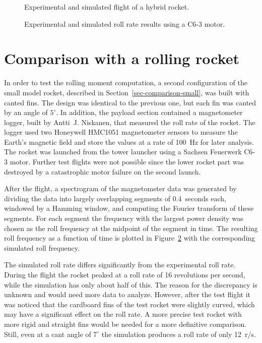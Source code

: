\begin{figure}[p]
\centering
{}
\caption{Experimental and simulated flight of a hybrid rocket.}
\label{fig-flight-haisunaata}
\end{figure}

\begin{figure}[p]
\centering
{}
\caption{Experimental and simulated roll rate results using a C6-3
  motor.}
\label{fig-flight-roll}
\end{figure}



\section{Comparison with a rolling rocket}
\label{sec-comparison-roll}

In order to test the rolling moment computation, a second
configuration of the small model rocket, described in
Section~\ref{sec-comparison-small}, was built with canted fins.  The
design was identical to the previous one, but each fin was canted by
an angle of $5^\circ$.  In addition, the payload section contained a
magnetometer logger, built by Antti~J. Niskanen, that measured the
roll rate of the rocket.  The logger used two Honeywell HMC1051
magnetometer sensors to measure the Earth's magnetic field and store
the values at a rate of 100~Hz for later analysis.  The rocket was
launched from the tower launcher using a Sachsen Feuerwerk C6-3
motor.  Further test flights were not possible since the lower rocket
part was destroyed by a catastrophic motor failure on the second
launch.

After the flight, a spectrogram of the magnetometer data was generated
by dividing the data into largely overlapping segments of 0.4~seconds each,
windowed by a Hamming window, and computing the Fourier transform of
these segments.  For each segment the frequency with the largest power
density was chosen as the roll frequency at the midpoint of the
segment in time.  The resulting roll frequency as a function of time
is plotted in Figure~\ref{fig-flight-roll} with the corresponding
simulated roll frequency.


The simulated roll rate differs significantly from the experimental
roll rate.  During the flight the rocket peaked at a roll rate of 16
revolutions per second, while the simulation has only about half of
this.  The reason for the discrepancy is unknown and would need more
data to analyze.  However, after the test flight it was noticed that
the cardboard fins of the test rocket were slightly curved, which may
have a significant effect on the roll rate.  A more precise test rocket
with more rigid and straight fins would be needed for a more
definitive comparison.  Still, even at a cant angle of $7^\circ$ the
simulation produces a roll rate of only 12~r/s.

